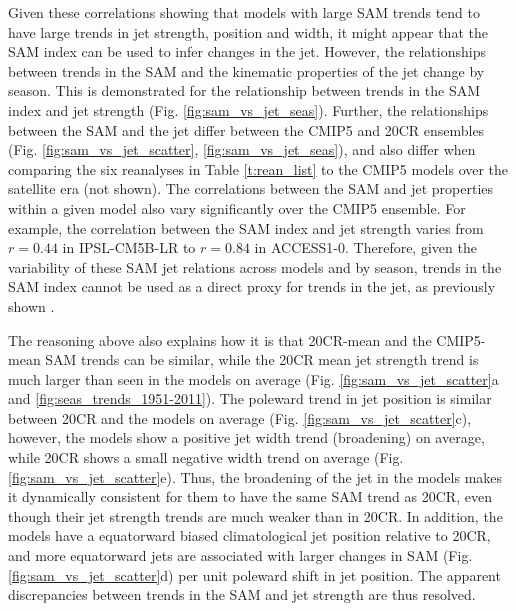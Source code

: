 \documentclass{ametsoc}
\begin{document}
Given these correlations showing that models with large SAM trends tend to have large trends 
in jet strength, position and width, it might appear that the SAM index can be used to infer
changes in the jet. However, the relationships between trends in the SAM and the kinematic
properties of the jet change by season. This is demonstrated for the relationship between
trends in the SAM index and jet strength (Fig. \ref{fig:sam_vs_jet_seas}). Further, the relationships between
the SAM and the jet differ between the CMIP5 and 20CR ensembles (Fig. \ref{fig:sam_vs_jet_scatter},
\ref{fig:sam_vs_jet_seas}), and also differ when comparing the six reanalyses in Table \ref{t:rean_list} 
to the CMIP5 models over the satellite era (not shown). The correlations between the SAM and jet 
properties within a given model also vary significantly over the CMIP5 ensemble. For example, the correlation 
between the SAM index and jet strength varies from $r=0.44$ in IPSL-CM5B-LR to $r=0.84$ in ACCESS1-0. 
Therefore, given the variability of these SAM jet relations across models and by season, trends in the SAM 
index cannot be used as a direct proxy for trends in the jet, as previously shown \citep{Thomas_et_al_2015, 
Monahan_and_Fyfe_2006, Monahan_and_Fyfe_2008}.

The reasoning above also explains how it is that 20CR-mean and the CMIP5-mean SAM 
trends can be similar,
while the 20CR mean jet strength trend is much larger than seen in the models on average 
(Fig. \ref{fig:sam_vs_jet_scatter}a and \ref{fig:seas_trends_1951-2011}). The poleward trend 
in jet position is similar between 20CR and the models
on average (Fig. \ref{fig:sam_vs_jet_scatter}c), however, the models show a positive jet width trend 
(broadening) on average, while 20CR shows a small negative width trend on average 
(Fig. \ref{fig:sam_vs_jet_scatter}e). Thus,
the broadening of the jet in the models makes it dynamically consistent for them to have the same 
SAM trend as 20CR, even though their jet strength trends are much weaker than in 20CR. In addition, 
the models have a equatorward biased climatological jet position relative to 20CR, and more 
equatorward jets are associated with larger changes in SAM (Fig. \ref{fig:sam_vs_jet_scatter}d) 
per unit poleward shift in jet position. The apparent discrepancies between trends in the SAM and
jet strength are thus resolved.  
\end{document}
